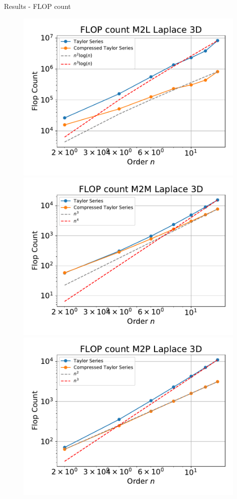 \documentclass[10pt]{beamer}
\begin{document}
\begin{frame}[fragile]{Results - FLOP count}
\begin{figure}
\includegraphics[scale=0.3]{figures/flops-laplace-M2L-3d.pdf}
\includegraphics[scale=0.3]{figures/flops-laplace-M2M-3d.pdf}
\includegraphics[scale=0.3]{figures/flops-laplace-M2P-3d.pdf}

\end{figure}
\end{frame}
\end{document}
